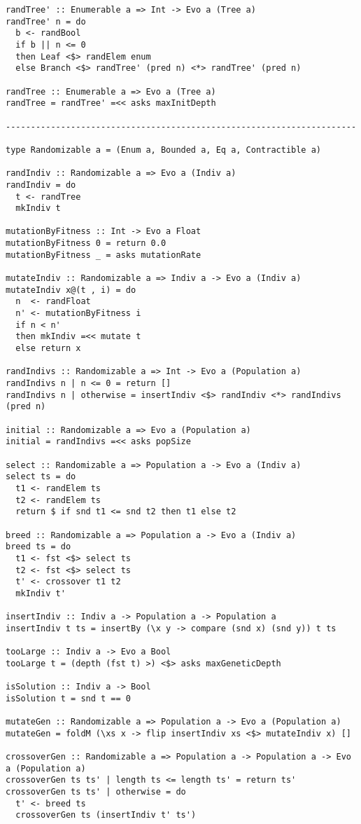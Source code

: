 \documentclass{article}
\begin{document}
\begin{lstlisting}
randTree' :: Enumerable a => Int -> Evo a (Tree a)
randTree' n = do
  b <- randBool
  if b || n <= 0
  then Leaf <$> randElem enum
  else Branch <$> randTree' (pred n) <*> randTree' (pred n)

randTree :: Enumerable a => Evo a (Tree a)
randTree = randTree' =<< asks maxInitDepth

----------------------------------------------------------------------

type Randomizable a = (Enum a, Bounded a, Eq a, Contractible a)

randIndiv :: Randomizable a => Evo a (Indiv a)
randIndiv = do
  t <- randTree
  mkIndiv t

mutationByFitness :: Int -> Evo a Float
mutationByFitness 0 = return 0.0
mutationByFitness _ = asks mutationRate

mutateIndiv :: Randomizable a => Indiv a -> Evo a (Indiv a)
mutateIndiv x@(t , i) = do
  n  <- randFloat
  n' <- mutationByFitness i
  if n < n'
  then mkIndiv =<< mutate t
  else return x

randIndivs :: Randomizable a => Int -> Evo a (Population a)
randIndivs n | n <= 0 = return []
randIndivs n | otherwise = insertIndiv <$> randIndiv <*> randIndivs (pred n)

initial :: Randomizable a => Evo a (Population a)
initial = randIndivs =<< asks popSize

select :: Randomizable a => Population a -> Evo a (Indiv a)
select ts = do
  t1 <- randElem ts
  t2 <- randElem ts
  return $ if snd t1 <= snd t2 then t1 else t2

breed :: Randomizable a => Population a -> Evo a (Indiv a)
breed ts = do
  t1 <- fst <$> select ts
  t2 <- fst <$> select ts
  t' <- crossover t1 t2
  mkIndiv t'

insertIndiv :: Indiv a -> Population a -> Population a
insertIndiv t ts = insertBy (\x y -> compare (snd x) (snd y)) t ts

tooLarge :: Indiv a -> Evo a Bool
tooLarge t = (depth (fst t) >) <$> asks maxGeneticDepth

isSolution :: Indiv a -> Bool
isSolution t = snd t == 0

mutateGen :: Randomizable a => Population a -> Evo a (Population a)
mutateGen = foldM (\xs x -> flip insertIndiv xs <$> mutateIndiv x) []

crossoverGen :: Randomizable a => Population a -> Population a -> Evo a (Population a)
crossoverGen ts ts' | length ts <= length ts' = return ts'
crossoverGen ts ts' | otherwise = do
  t' <- breed ts
  crossoverGen ts (insertIndiv t' ts')


\end{lstlisting}
\end{document}
